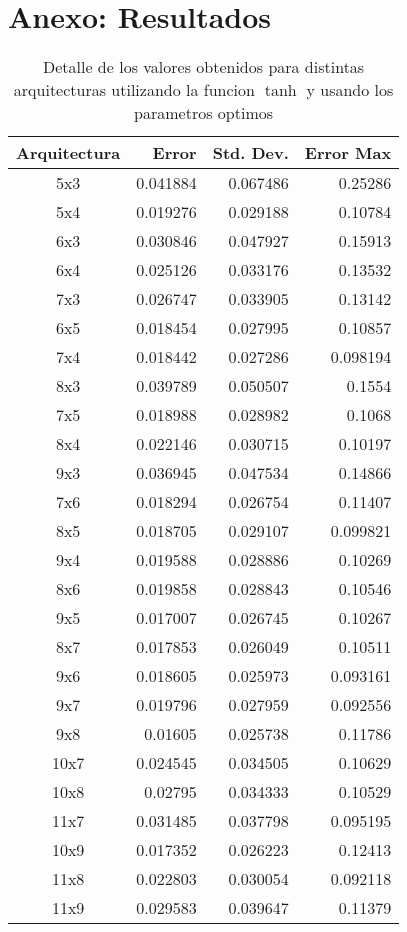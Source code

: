 \section*{Anexo: Resultados}

\begin{table}[H]
    \begin{tabular}{c|r|r|r}
        Arquitectura & Error & Std. Dev. & Error Max  \\
        \hline
        5x3 & 0.041884 & 0.067486 & 0.25286 \\
        5x4 & 0.019276 & 0.029188 & 0.10784 \\
        6x3 & 0.030846 & 0.047927 & 0.15913 \\
        6x4 & 0.025126 & 0.033176 & 0.13532 \\
        7x3 & 0.026747 & 0.033905 & 0.13142 \\
        6x5 & 0.018454 & 0.027995 & 0.10857 \\
        7x4 & 0.018442 & 0.027286 & 0.098194 \\
        8x3 & 0.039789 & 0.050507 & 0.1554 \\
        7x5 & 0.018988 & 0.028982 & 0.1068 \\
        8x4 & 0.022146 & 0.030715 & 0.10197 \\
        9x3 & 0.036945 & 0.047534 & 0.14866 \\
        7x6 & 0.018294 & 0.026754 & 0.11407 \\
        8x5 & 0.018705 & 0.029107 & 0.099821 \\
        9x4 & 0.019588 & 0.028886 & 0.10269 \\
        8x6 & 0.019858 & 0.028843 & 0.10546 \\
        9x5 & 0.017007 & 0.026745 & 0.10267 \\
        8x7 & 0.017853 & 0.026049 & 0.10511 \\
        9x6 & 0.018605 & 0.025973 & 0.093161 \\
        9x7 & 0.019796 & 0.027959 & 0.092556 \\
        9x8 & 0.01605 & 0.025738 & 0.11786 \\
        10x7 & 0.024545 & 0.034505 & 0.10629 \\
        10x8 & 0.02795 & 0.034333 & 0.10529 \\
        11x7 & 0.031485 & 0.037798 & 0.095195 \\
        10x9 & 0.017352 & 0.026223 & 0.12413 \\
        11x8 & 0.022803 & 0.030054 & 0.092118 \\
        11x9 & 0.029583 & 0.039647 & 0.11379 \\
    \end{tabular}

    \caption{Detalle de los valores obtenidos para distintas arquitecturas utilizando la funcion $\tanh$ y usando los parametros optimos}
    \label{tab:arquitectura_full}
 
\end{table}
